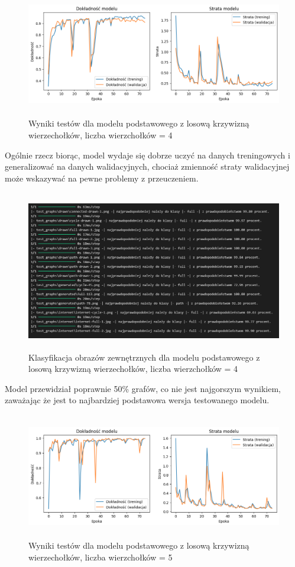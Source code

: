 \begin{figure}[ht]
	\centering
	\includegraphics[height=5.5cm]{resources/tests/images/v3/base4_img.png}
	\caption{Wyniki testów dla modelu podstawowego z losową krzywizną wierzechołków, liczba wierzchołków = 4}
	\label{Fig:tests-base-1}
\end{figure}
\FloatBarrier

Ogólnie rzecz biorąc, model wydaje się dobrze uczyć na danych treningowych i generalizować na danych walidacyjnych,
chociaż zmienność straty walidacyjnej może wskazywać na pewne problemy z przeuczeniem.

\begin{figure}[ht]
	\centering
	\includegraphics[height=7cm]{resources/tests/images/v3/base4_txt.png}
	\caption{Klasyfikacja obrazów zewnętrznych dla modelu podstawowego z losową krzywizną wierzechołków, liczba wierzchołków = 4}
	\label{Fig:tests-base-2}
\end{figure}
\FloatBarrier

Model przewidział poprawnie 50\% grafów, co nie jest najgorszym wynikiem,
zaważając że jest to najbardziej podstawowa wersja testowanego modelu.

\begin{figure}[ht]
	\centering
	\includegraphics[height=5.5cm]{resources/tests/images/v3/base5_img.png}
	\caption{Wyniki testów dla modelu podstawowego z losową krzywizną wierzechołków, liczba wierzchołków = 5}
	\label{Fig:tests-base-1}
\end{figure}
\FloatBarrier

